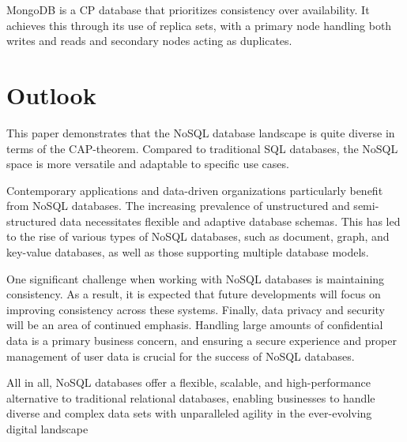 MongoDB is a \ac{CP} database that prioritizes consistency over availability. It achieves this through its use of replica sets, with a primary node handling both writes and reads and secondary nodes acting as duplicates.

\section{Outlook}

This paper demonstrates that the NoSQL database landscape is quite diverse in terms of the \ac{CAP}-theorem. Compared to traditional SQL databases, the NoSQL space is more versatile and adaptable to specific use cases.

Contemporary applications and data-driven organizations particularly benefit from NoSQL databases. The increasing prevalence of unstructured and semi-structured data necessitates flexible and adaptive database schemas. This has led to the rise of various types of NoSQL databases, such as document, graph, and key-value databases, as well as those supporting multiple database models.

One significant challenge when working with NoSQL databases is maintaining consistency. As a result, it is expected that future developments will focus on improving consistency across these systems. Finally, data privacy and security will be an area of continued emphasis. Handling large amounts of confidential data is a primary business concern, and ensuring a secure experience and proper management of user data is crucial for the success of NoSQL databases.

All in all, NoSQL databases offer a flexible, scalable, and high-performance alternative to traditional relational databases, enabling businesses to handle diverse and complex data sets with unparalleled agility in the ever-evolving digital landscape
